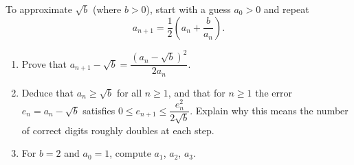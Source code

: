 To approximate $\sqrt b$ (where $b>0$), start with a guess $a_0>0$ and repeat
\[
a_{n+1}=\dfrac{1}{2}\left(a_n+\dfrac{b}{a_n}\right).
\]
\begin{enumerate}
\item[(a)] Prove that $a_{n+1}-\sqrt b=\dfrac{\left(a_n-\sqrt b\right)^2}{2a_n}$.
\item[(b)] Deduce that $a_n\ge\sqrt b$ for all $n\ge1$, and that for $n\ge1$ the error $e_n=a_n-\sqrt b$ satisfies $0\le e_{n+1}\le\dfrac{e_n^2}{2\sqrt b}$. Explain why this means the number of correct digits roughly doubles at each step.
\item[(c)] For $b=2$ and $a_0=1$, compute $a_1$, $a_2$, $a_3$.
\end{enumerate}
